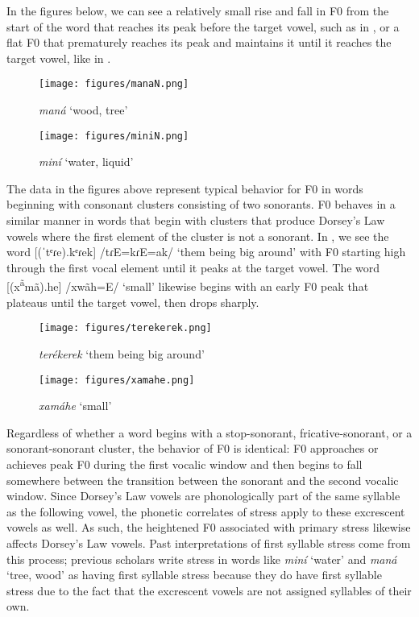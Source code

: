 In the figures below, we can see a relatively small rise and fall in F0 from the start of the word that reaches its peak before the target vowel, such as in , or a flat F0 that prematurely reaches its peak and maintains it until it reaches the target vowel, like in .


\begin{figure}
\caption{\textit{maná} `wood, tree'}\label{manaN}
\texttt{[image: figures/manaN.png]}
\end{figure}

\begin{figure}
\caption{\textit{miní} `water, liquid'}\label{miniN}
\texttt{[image: figures/miniN.png]}
\end{figure}


The data in the figures above represent typical behavior for F0 in words beginning with consonant clusters consisting of two sonorants.
F0 behaves in a similar manner in words that begin with clusters that produce Dorsey's Law vowels where the first element of the cluster is not a sonorant. In , we see the word [(ˈtᵉɾe).kᵉɾek] /tɾE=kɾE=ak/ `them being big around' with F0 starting high through the first vocal element until it peaks at the target vowel. The word [(x\textsuperscript{ã}mã).he] /xwãh=E/ `small' likewise begins with an early F0 peak that plateaus until the target vowel, then drops sharply.


\begin{figure}
\caption{\textit{terékerek} `them being big around'}\label{terekerek}
\texttt{[image: figures/terekerek.png]}
\end{figure}
\begin{figure}
\caption{\textit{xamáhe} `small'}\label{xamahe}
\texttt{[image: figures/xamahe.png]}
\end{figure}


Regardless of whether a word begins with a stop-sonorant, fricative-sonorant, or a sonorant-sonorant cluster, the behavior of F0 is identical: F0 approaches or achieves peak F0 during the first vocalic window and then begins to fall somewhere between the transition between the sonorant and the second vocalic window. Since Dorsey's Law vowels are phonologically part of the same syllable as the following vowel, the phonetic correlates of stress apply to these excrescent vowels as well. As such, the heightened F0 associated with primary stress likewise affects Dorsey's Law vowels. Past interpretations of first syllable stress come from this process; previous scholars write stress in words like \textit{miní} `water' and \textit{maná} `tree, wood' as having first syllable stress because they do have first syllable stress due to the fact that the excrescent vowels are not assigned syllables of their own.

